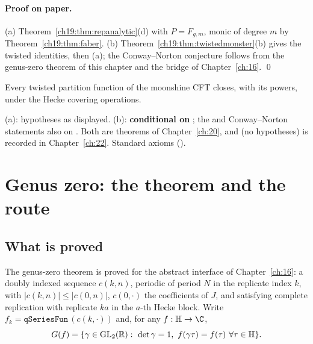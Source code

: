 \paragraph{Proof on paper.}  (a) Theorem~\ref{ch19:thm:repanalytic}(d) with $P=F_{g,m}$, monic of degree $m$ by
Theorem~\ref{ch19:thm:faber}.  (b) Theorem~\ref{ch19:thm:twistedmonster}(b) gives the twisted identities, then (a); the
Conway--Norton conjecture follows from the genus-zero theorem of this chapter and the bridge of Chapter~\ref{ch:16}. \qed
\begin{physics}Every twisted partition function of the moonshine CFT closes, with its powers, under the Hecke covering
operations.\end{physics}
\begin{status}
(a): hypotheses as displayed.  (b): \textbf{conditional on} ; the  and Conway--Norton
statements also on .  Both are theorems of Chapter~\ref{ch:20}, and  (no hypotheses)
is recorded in Chapter~\ref{ch:22}.  Standard axioms ().
\end{status}

\section{Genus zero: the theorem and the route}\label{ch19:sec:gz}

\subsection{What is proved}

The genus-zero theorem is proved for the abstract interface  of Chapter~\ref{ch:16}: a doubly
indexed sequence $c(k,n)$, periodic of period $N$ in the replicate index $k$, with $|c(k,n)|\le|c(0,n)|$, $c(0,\cdot)$ the
coefficients of $J$, and satisfying complete replication with replicate $ka$ in the $a$-th Hecke block.  Write
$f_k=\mathtt{qSeriesFun}\,(c(k,\cdot))$ and, for any $f:\chnineteenH\to\C$,
\begin{equation*}
  G(f)=\{\gamma\in\chnineteenGLR:\ \det\gamma=1,\ f(\gamma\tau)=f(\tau)\ \forall\tau\in\chnineteenH\}.
\end{equation*}

